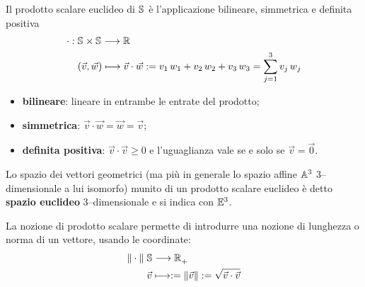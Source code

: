 \begin{definizione}
  Il prodotto scalare euclideo di $\mathbb{S}^{}$ è l'applicazione bilineare, 
simmetrica 
  e definita positiva
  \[\begin{aligned}
    \cdot : & \; \mathbb{S}^{}\times\mathbb{S}^{} \longrightarrow \mathbb{R}^{} \\
         & \; (\vec v,\vec w) \longmapsto \vec v\cdot \vec w := v_1\,w_1 + 
v_2\,w_2 + v_3\,w_3 
         = \sum_{j=1}^3 v_j\,w_j
  \end{aligned}\]
\end{definizione}

\begin{itemize}
  \item \textbf{bilineare}: lineare in entrambe le entrate del prodotto; 
  \item \textbf{simmetrica}: $\vec v\cdot \vec w = \vec w = \vec v$;
  \item \textbf{definita positiva}: $\vec v\cdot \vec v \ge 0$ e l'uguaglianza 
vale se e solo se 
            $\vec v = \vec 0$.
\end{itemize}
Lo spazio dei vettori geometrici (ma più in generale lo spazio affine 
$\mathbb{A}^{3}$ 3--dimensionale 
a lui isomorfo) munito di un prodotto scalare euclideo è detto \textbf{spazio 
euclideo} 
3--dimensionale e si indica con $\mathbb{E}^{3}$.

La nozione di prodotto scalare permette di introdurre una nozione di lunghezza 
o norma 
di un vettore, usando le coordinate:
\[\begin{aligned}
  \|\cdot \| &\; \mathbb{S}^{} \longrightarrow \mathbb{R}^{}_+\\
  &\; \vec v \longmapsto := \|\vec v\| := \sqrt{\vec v\cdot \vec v}
\end{aligned}\]

